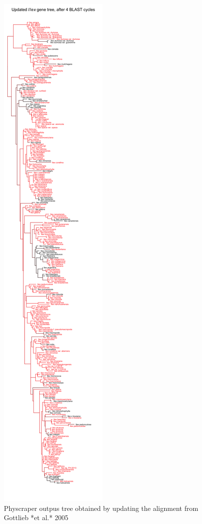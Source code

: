 \documentclass[]{article}
\begin{document}
\begin{figure}
\includegraphics[width=1\linewidth]{docs/figs/ilex-plot-tips-and-branches-1} \caption{Physcraper outpus tree obtained by updating the alignment from Gottlieb *et al.* 2005}\label{fig:ilex-updated-tree}
\end{figure}
\end{document}
